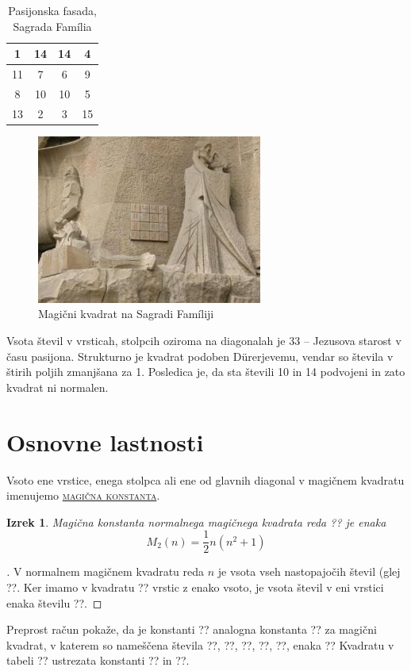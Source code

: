 \documentclass[a4paper,12pt]{article}
\newcommand{\pojem}[1]{\underline{\textsc{#1}}}
\newenvironment{dokaz}{\begin{proof}[\bfseries \upshape \proofname]}{\end{proof}}
\newenvironment{magic}[3]{\begin{table}[!ht]
   \centering
   \caption{#2}
   \label{#3}
\begin{tabular}{|*{#1}{c|}}
\hline}{\end{tabular}\end{table}}
\theoremstyle{definition}
\theoremstyle{plain}
\newtheorem{izrek}{Izrek}
\begin{document}
\begin{magic}{4}{Pasijonska fasada, Sagrada Família}{table:sagradafamilia}
    1 & 14 & 14 &  4 \\ \hline
    11 &  7 &  6 &  9 \\ \hline
    8 & 10 & 10 &  5 \\ \hline
    13 &  2 &  3 & 15 \\ \hline
\end{magic}

\begin{figure}[!ht]
\centering\caption{Magični kvadrat na Sagradi Famíliji}
\label{fig:sagrada}
\includegraphics[scale=0.45]{sagrada.png}
\end{figure}

Vsota števil v vrsticah, stolpcih oziroma na diagonalah je 33 -- Jezusova starost
v času pasijona. Strukturno je kvadrat podoben Dürerjevemu, vendar so števila
v štirih poljih zmanjšana za 1. Posledica je, da sta števili 10 in 14 podvojeni
in zato kvadrat ni normalen.


\section{Osnovne lastnosti}

   Vsoto ene vrstice, enega stolpca ali ene od glavnih diagonal
   v magičnem kvadratu imenujemo \pojem{magična konstanta}.
\begin{izrek}
   Magična konstanta normalnega magičnega kvadrata reda ??
   je enaka
   \begin{equation}
      \label{eq:izrek}
      M_2 (n)=\frac{1}{2}n (n^2 +1)
   \end{equation}
\end{izrek}
\begin{dokaz}
   V normalnem magičnem kvadratu reda $n$ je vsota vseh nastopajočih
   števil (glej %
   ??. Ker imamo
   v kvadratu ?? vrstic z enako vsoto, je vsota števil v eni vrstici
   enaka številu ??.
\end{dokaz}
Preprost račun pokaže, da je konstanti ?? analogna konstanta
?? za magični kvadrat, v katerem so nameščena števila
??, ??, ??, ??, ??, enaka
??
Kvadratu v tabeli ?? ustrezata konstanti ?? in ??.
\end{document}
